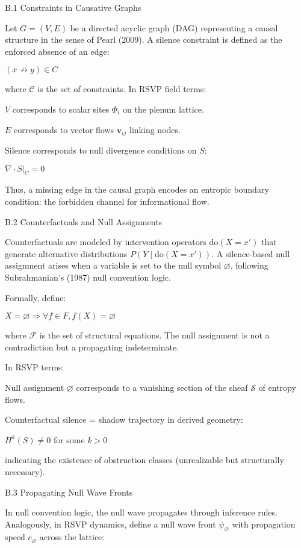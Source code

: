 \documentclass[11pt,a4paper]{article}
\begin{document}
B.1 Constraints in Causative Graphs

Let $G = (V,E)$ be a directed acyclic graph (DAG) representing a causal structure in the sense of Pearl (2009). A silence constraint is defined as the enforced absence of an edge:

$(x \not\to y) \in C$

where $\mathcal{C}$ is the set of constraints. In RSVP field terms:

$V$ corresponds to scalar sites $\Phi_i$ on the plenum lattice.

$E$ corresponds to vector flows $\mathbf{v}_{ij}$ linking nodes.

Silence corresponds to null divergence conditions on $S$:

$\nabla \cdot S |_C = 0$

Thus, a missing edge in the causal graph encodes an entropic boundary condition: the forbidden channel for informational flow.

B.2 Counterfactuals and Null Assignments

Counterfactuals are modeled by intervention operators $\mathrm{do}(X=x')$ that generate alternative distributions $P(Y \mid \mathrm{do}(X=x'))$. A silence-based null assignment arises when a variable is set to the null symbol $\varnothing$, following Subrahmanian’s (1987) null convention logic.

Formally, define:

$X = \varnothing \Rightarrow \forall f \in F, f(X) = \varnothing$

where $\mathcal{F}$ is the set of structural equations. The null assignment is not a contradiction but a propagating indeterminate.

In RSVP terms:

Null assignment $\varnothing$ corresponds to a vanishing section of the sheaf $\mathcal{S}$ of entropy flows.

Counterfactual silence = shadow trajectory in derived geometry:

$H^k (S) \neq 0$ for some $k > 0$

indicating the existence of obstruction classes (unrealizable but structurally necessary).

B.3 Propagating Null Wave Fronts

In null convention logic, the null wave propagates through inference rules. Analogously, in RSVP dynamics, define a null wave front $\psi_{\varnothing}$ with propagation speed $c_\varnothing$ across the lattice:
\end{document}
